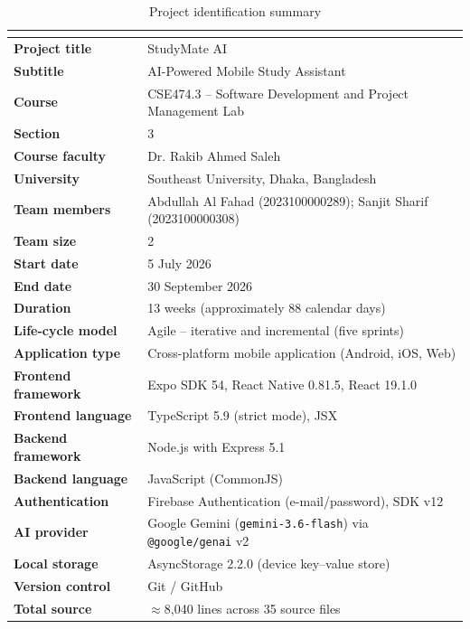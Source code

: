 \documentclass[12pt,a4paper,oneside]{report}
\begin{document}
\begin{table}[H]
\centering
\caption{Project identification summary}
\label{tab:identity}
\small
\begin{tabularx}{\textwidth}{@{}>{\bfseries}p{4.4cm}X@{}}
\toprule
\rowcolor{softgray} \multicolumn{2}{@{}l@{}}{\textbf{Project particulars}} \\
\midrule
Project title        & StudyMate AI \\
Subtitle             & AI-Powered Mobile Study Assistant \\
Course               & CSE474.3 -- Software Development and Project Management Lab \\
Section              & 3 \\
Course faculty       & Dr. Rakib Ahmed Saleh \\
University           & Southeast University, Dhaka, Bangladesh \\
Team members         & Abdullah Al Fahad (2023100000289); Sanjit Sharif (2023100000308) \\
Team size            & 2 \\
Start date           & 5 July 2026 \\
End date             & 30 September 2026 \\
Duration             & 13 weeks (approximately 88 calendar days) \\
Life-cycle model     & Agile -- iterative and incremental (five sprints) \\
Application type     & Cross-platform mobile application (Android, iOS, Web) \\
Frontend framework   & Expo SDK 54, React Native 0.81.5, React 19.1.0 \\
Frontend language    & TypeScript 5.9 (strict mode), JSX \\
Backend framework    & Node.js with Express 5.1 \\
Backend language     & JavaScript (CommonJS) \\
Authentication       & Firebase Authentication (e-mail/password), SDK v12 \\
AI provider          & Google Gemini (\texttt{gemini-3.6-flash}) via \texttt{@google/genai} v2 \\
Local storage        & AsyncStorage 2.2.0 (device key--value store) \\
Version control      & Git / GitHub \\
Total source         & $\approx$8{,}040 lines across 35 source files \\
\bottomrule
\end{tabularx}
\end{table}
\end{document}
